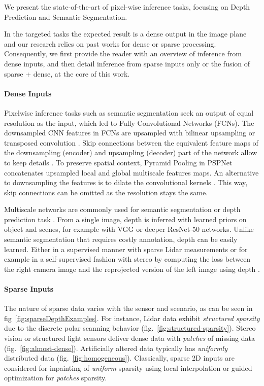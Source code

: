 \documentclass[10pt,twocolumn,letterpaper]{article}
\begin{document}
We present the state-of-the-art of pixel-wise inference tasks, focusing on Depth Prediction and Semantic Segmentation. 


In the targeted tasks the expected result is a dense output in the image plane and our research relies on past works for dense or sparse processing. Consequently, we first provide the reader with an overview of inference from dense inputs, and then detail inference from sparse inputs only or the fusion of sparse + dense, at the core of this work.

\paragraph{Dense Inputs}

Pixelwise inference tasks such as semantic segmentation seek an output of equal resolution as the input, which led to Fully Convolutional Networks (FCNs). The downsampled CNN features in FCNs are upsampled with bilinear upsampling or transposed convolution \cite{long2015fully}. Skip connections between the equivalent feature maps of the downsampling (encoder) and upsampling (decoder) part of the network allow to keep details \cite{ronneberger2015u, badrinarayanan2017segnet}. 
To preserve spatial context, Pyramid Pooling in PSPNet \cite{zhao2017pyramid} concatenates upsampled local and global multiscale features maps. 
An alternative to downsampling the features is to dilate the convolutional kernels \cite{chen2018deeplab}. This way, skip connections can be omitted as the resolution stays the same.

Multiscale networks are commonly used for semantic segmentation \cite{long2015fully} or depth prediction task \cite{eigen2014depth}. From a single image, depth is inferred with learned priors on object and scenes, for example with VGG \cite{eigen2014depth} or deeper ResNet-50 \cite{laina2016deeper} networks.
Unlike semantic segmentation that requires costly annotation, depth can be easily learned. Either in a supervised manner with sparse Lidar measurements \cite{kuznietsov2017semi} or for example in a self-supervised fashion with stereo by computing the loss between the right camera image and the reprojected version of the left image using depth \cite{godard2017unsupervised}.


\paragraph{Sparse Inputs}
The nature of sparse data varies with the sensor and scenario, as can be seen in fig~\ref{fig:sparseDepthExamples}.
For instance, Lidar data exhibit \textit{structured sparsity} due to the discrete polar scanning behavior (fig.~\ref{fig:structured-sparsity}).
Stereo vision or structured light sensors deliver dense data with \textit{patches} of missing data (fig.~\ref{fig:almost-dense}).
Artificially altered data typically has \textit{uniformly} distributed data (fig.~\ref{fig:homogeneous}).
Classically, sparse 2D inputs are considered for inpainting of \textit{uniform} sparsity using local interpolation \cite{ku2018defense} or guided optimization \cite{silberman2012indoor} for \textit{patches} sparsity.
\end{document}
